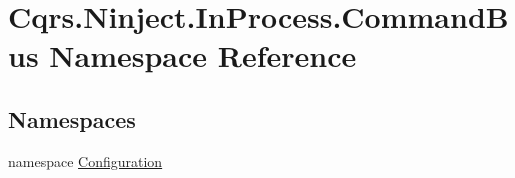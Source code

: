 \hypertarget{namespaceCqrs_1_1Ninject_1_1InProcess_1_1CommandBus}{}\section{Cqrs.\+Ninject.\+In\+Process.\+Command\+Bus Namespace Reference}
\label{namespaceCqrs_1_1Ninject_1_1InProcess_1_1CommandBus}
\subsection*{Namespaces}
\begin{DoxyCompactItemize}
\item 
namespace \hyperlink{namespaceCqrs_1_1Ninject_1_1InProcess_1_1CommandBus_1_1Configuration}{Configuration}
\end{DoxyCompactItemize}
